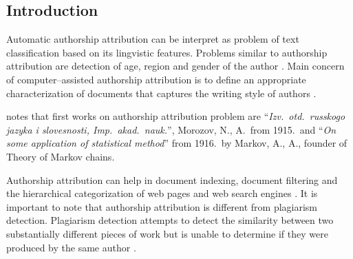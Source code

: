 \documentclass[11pt,english]{article}
\newcommand{\engl}[1]{(engl.~\emph{#1})}
\begin{document}
\begin{multicols}{2}
\section{Introduction}
Automatic authorship attribution can be interpret as problem of text
classification based on its lingvistic features. Problems similar to authorship
attribution are detection of age, region and gender of the author
\citep{luyckx2005shallow}. Main concern of computer--assisted authorship
attribution is to define an appropriate characterization of documents that
captures the writing style of authors \citep{coyotl2006authorship}.

\citet{kukushkina2001using} notes that first works on authorship attribution
problem are ``\emph{Izv.~otd.~russkogo jazyka i slovesnosti, Imp.~akad.~nauk.}'',
Morozov, N., A.\ from 1915.\  and ``\emph{On some application of statistical
method}'' from 1916.\ by Markov, A., A., founder of Theory of Markov chains.

Authorship attribution can help in document indexing, document filtering and the
hierarchical categorization of web pages and web search engines
\citep{luyckx2005shallow}. It is important to note that authorship attribution is
different from plagiarism detection. Plagiarism detection attempts to detect the
similarity between two substantially different pieces of work but is unable to
determine if they were produced by the same author \citep{de2001mining}.


\end{multicols}
\end{document}
